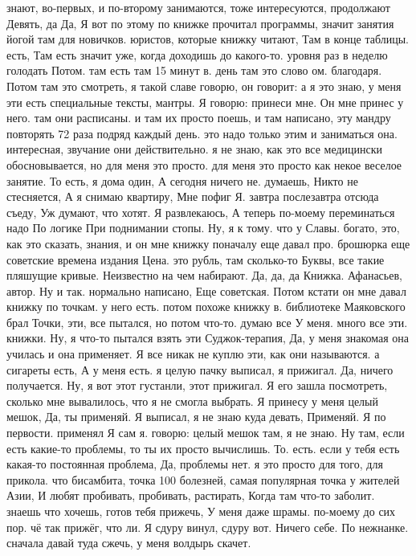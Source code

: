 знают, во-первых, и по-второму занимаются, тоже интересуются, продолжают Девять, да Да, Я вот по этому по книжке прочитал программы, значит занятия йогой там для новичков.
юристов, которые книжку читают, Там в конце таблицы.
есть, Там есть значит уже, когда доходишь до какого-то.
уровня раз в неделю голодать Потом.
там есть там 15 минут в.
день там это слово ом.
благодаря.
Потом там это смотреть, я такой славе говорю, он говорит: а я это знаю, у меня эти есть специальные тексты, мантры.
Я говорю: принеси мне.
Он мне принес у него. там они расписаны.
и там их просто поешь, и там написано, эту мандру повторять 72 раза подряд каждый день. это надо только этим и заниматься она. интересная, звучание они действительно. я не знаю, как это все медицински обосновывается, но для меня это просто.
для меня это просто как некое веселое занятие. То есть, я дома один,
А сегодня ничего не.
думаешь, Никто не стесняется, А я снимаю квартиру, Мне пофиг Я.
завтра послезавтра отсюда съеду, Уж думают, что хотят. Я развлекаюсь, А теперь по-моему переминаться надо По логике При поднимании стопы. Ну, я к тому.
что у Славы.
богато, это, как это сказать, знания, и он мне книжку поначалу еще давал про.
брошюрка еще советские времена издания Цена.
это рубль, там сколько-то Буквы, все такие пляшущие кривые.
Неизвестно на чем набирают.
Да, да, да Книжка.
Афанасьев, автор. Ну и так.
нормально написано, Еще советская. Потом кстати он мне давал книжку по точкам. у него есть.
потом похоже книжку в.
библиотеке Маяковского брал Точки, эти, все пытался, но потом что-то.
думаю все У меня.
много все эти.
книжки. Ну, я что-то пытался взять эти Суджок-терапия, Да, у меня знакомая она училась и она применяет. Я все никак не куплю эти, как они называются.
а сигареты есть, А у меня есть. я целую пачку выписал, я прижигал.
Да, ничего получается. Ну, я вот этот густанли, этот прижигал. Я его зашла посмотреть, сколько мне вывалилось, что я не смогла выбрать. Я принесу у меня целый мешок, Да, ты применяй. Я выписал, я не знаю куда девать, Применяй.
Я по первости.
применял Я сам я.
говорю: целый мешок там, я не знаю.
Ну там, если есть какие-то проблемы, то ты их просто вычислишь. То.
есть. если у тебя есть какая-то постоянная проблема, Да, проблемы нет. я это просто для того, для прикола.
что бисамбита, точка 100 болезней, самая популярная точка у жителей Азии, И любят пробивать, пробивать, растирать, Когда там что-то заболит. знаешь что хочешь, готов тебя прижечь, У меня даже шрамы.
по-моему до сих пор.
чё так прижёг, что ли.
Я сдуру винул, сдуру вот.
Ничего себе.
По нежнанке. сначала давай туда сжечь, у меня волдырь скачет.
